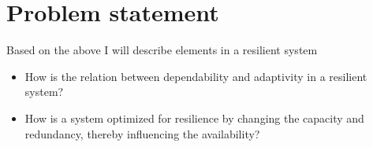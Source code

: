 \section{Problem statement}
\label{sc:problem_statement}
Based on the above I will describe elements in a resilient system 

\begin{itemize}
\item How is the relation between dependability and adaptivity in a resilient system?
\item How is a system optimized for resilience by changing the capacity and redundancy, thereby influencing the availability?
\end{itemize}